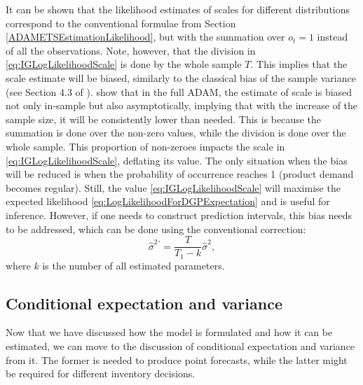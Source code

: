 \documentclass[]{book}
\theoremstyle{definition}
\theoremstyle{definition}
\theoremstyle{definition}
\theoremstyle{definition}
\theoremstyle{remark}
\begin{document}
It can be shown that the likelihood estimates of scales for different distributions correspond to the conventional formulae from Section \ref{ADAMETSEstimationLikelihood}, but with the summation over \(o_t=1\) instead of all the observations. Note, however, that the division in \eqref{eq:IGLogLikelihoodScale} is done by the whole sample \(T\). This implies that the scale estimate will be biased, similarly to the classical bias of the sample variance (see Section 4.3 of \citet{SvetunkovSBA}). \citet{Svetunkov2019a} show that in the full ADAM, the estimate of scale is biased not only in-sample but also asymptotically, implying that with the increase of the sample size, it will be consistently lower than needed. This is because the summation is done over the non-zero values, while the division is done over the whole sample. This proportion of non-zeroes impacts the scale in \eqref{eq:IGLogLikelihoodScale}, deflating its value. The only situation when the bias will be reduced is when the probability of occurrence reaches 1 (product demand becomes regular). Still, the value \eqref{eq:IGLogLikelihoodScale} will maximise the expected likelihood \eqref{eq:LogLikelihoodForDGPExpectation} and is useful for inference. However, if one needs to construct prediction intervals, this bias needs to be addressed, which can be done using the conventional correction:
\begin{equation}
\hat{\sigma}^2{^{\prime}} = \frac{T}{T_1-k} \hat{\sigma}^2,
\label{eq:scaleFixed}
\end{equation}
where \(k\) is the number of all estimated parameters.

\hypertarget{conditional-expectation-and-variance}{%
\subsection{Conditional expectation and variance}\label{conditional-expectation-and-variance}}

Now that we have discussed how the model is formulated and how it can be estimated, we can move to the discussion of conditional expectation and variance from it. The former is needed to produce point forecasts, while the latter might be required for different inventory decisions.
\end{document}
